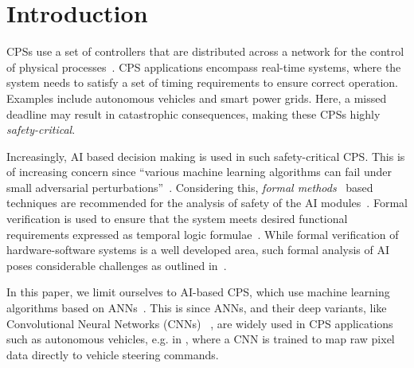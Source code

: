 \section{Introduction}
\label{sec:intro}



\acp{CPS} use a set of controllers that are distributed across a network for the 
control of physical processes~\cite{alur2015principles}. \ac{CPS} applications encompass real-time systems, where 
the system needs to satisfy a set of timing requirements to ensure correct operation. Examples include autonomous vehicles and
smart power grids. Here, a missed deadline may result in catastrophic consequences, making these \acp{CPS} highly 
\textit{safety-critical}. 

Increasingly, \acf{AI} based decision making is used in such safety-critical \ac{CPS}. 
This is of increasing concern since ``various machine learning algorithms can fail under small adversarial perturbations''~\cite{seshia2016towards}.
Considering this, \emph{formal methods}~\cite{clarke1999model} based techniques are recommended for the analysis of safety of the AI modules~\cite{russell2015}.
Formal verification is used to ensure that the system meets desired functional 
requirements expressed as temporal logic formulae~\cite{clarke1999model}.
While formal verification of hardware-software systems is a well developed area, such formal analysis of 
 \ac{AI} poses considerable challenges as outlined in~\cite{seshia2016towards}. 

In this paper, we limit ourselves to \ac{AI}-based CPS, which use machine learning algorithms based on \acp{ANN}~\cite{yegnanarayana1994artificial}. 
This is since \ac{ANN}s, and their deep variants, like Convolutional Neural Networks (CNNs) ~\cite{schmidhuber2015deep}, 
are widely used in \ac{CPS} applications such as autonomous vehicles, e.g. in \cite{EndToEndLearningForSelfDrivingCars},
where a \ac{CNN} is trained to map raw pixel data directly to vehicle steering commands.

